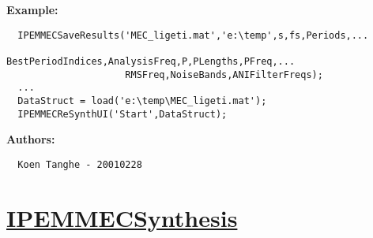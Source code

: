 \textbf{Example:}
\begin{verbatim}  IPEMMECSaveResults('MEC_ligeti.mat','e:\temp',s,fs,Periods,...
                     BestPeriodIndices,AnalysisFreq,P,PLengths,PFreq,...
                     RMSFreq,NoiseBands,ANIFilterFreqs);
  ... 
  DataStruct = load('e:\temp\MEC_ligeti.mat');
  IPEMMECReSynthUI('Start',DataStruct);

\end{verbatim}
\textbf{Authors:}
\begin{verbatim}  Koen Tanghe - 20010228
\end{verbatim}


\newpage
\section*{\hyperlink{Concepts:IPEMMECSynthesis}{IPEMMECSynthesis}}
\hypertarget{FuncRef:IPEMMECSynthesis}{}

